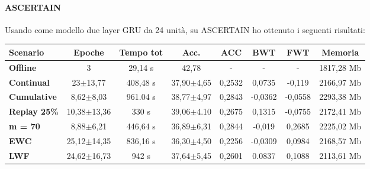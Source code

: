 \documentclass[11pt, a4paper, twoside, openright]{book}
\begin{document}
\paragraph{ASCERTAIN} Usando come modello due layer GRU da 24 unità, su ASCERTAIN ho ottenuto i seguenti risultati:\\
\begin{tabular}{l|c|c|c|c|c|c|c}
\textbf{Scenario} & \textbf{Epoche} & \textbf{Tempo tot} & \textbf{Acc.} & \textbf{ACC} & \textbf{BWT} & \textbf{FWT} & \textbf{Memoria}\\
\hline
 \textbf{Offline} & 3 & 29,14 s & 42,78 & - & - & - & 1817,28 Mb\\
\textbf{Continual} & 23$\pm$13,77 & 408,48 s & 37,90$\pm$4,65 & 0,2532 & 0,0735 & -0,119 & 2166,97 Mb\\
\textbf{Cumulative} & 8,62$\pm$8,03 & 961.04 s & 38,77$\pm$4,97 & 0,2843 & -0,0362 & -0,0558 & 2293,38 Mb\\
\textbf{Replay 25\%} & 10,38$\pm$13,36 & 330 s & 39,06$\pm$4.10 & 0,2675 & 0,1315 & -0,0755 & 2172,41 Mb\\
\textbf{m = 70} & 8,88$\pm$6,21 & 446,64 s & 36,89$\pm$6,31 & 0,2844 & -0,019 & 0,2685 & 2225,02 Mb\\
\textbf{EWC} & 25,12$\pm$14,35 & 836,16 s & 36,30$\pm$4,50 & 0,2256 & -0,0309 & 0,0984 & 2168,57 Mb\\
\textbf{LWF} & 24,62$\pm$16,73 & 942 s & 37,64$\pm$5,45 & 0,2601 & 0.0837 & 0,1088 & 2113,61 Mb\\
\end{tabular}
\fi
\end{document}
